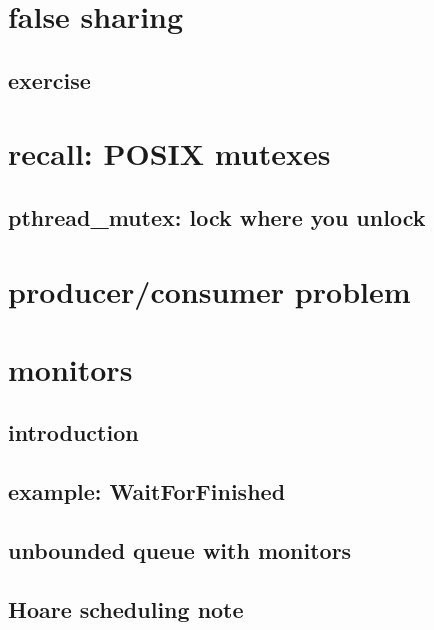 

\section{false sharing}


\subsection{exercise}

\section{recall: POSIX mutexes}


\subsection{pthread\_mutex: lock where you unlock}


\section{producer/consumer problem}


\section{monitors}

\subsection{introduction}

\subsection{example: WaitForFinished}


\subsection{unbounded queue with monitors}


\subsection{Hoare scheduling note}


